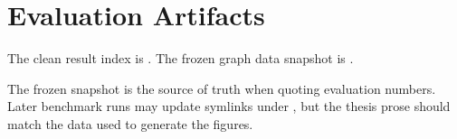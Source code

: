 \chapter{Evaluation Artifacts}

The clean result index is . The frozen graph
data snapshot is .

The frozen snapshot is the source of truth when quoting evaluation numbers.
Later benchmark runs may update symlinks under ,
but the thesis prose should match the data used to generate the figures.
